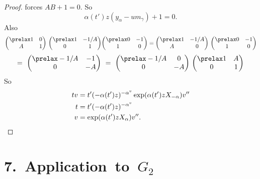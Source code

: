 \documentclass{memo-l}
\theoremstyle{definition}
\theoremstyle{remark}
\numberwithin{section}{chapter}
\numberwithin{equation}{chapter}
\begin{document}
\begin{proof}
\noindent
forces  $AB + 1 = 0$.  So
$$
{\alpha}(t')z(y_{{\alpha}}-um_{{\gamma}})+1 = 0 .
$$
Also
$$
{\begin{pmatrix} \prelax  1 & 0 \\ A & 1 \end{pmatrix}}\ {\begin{pmatrix} \prelax  1 & -1/A \\ 0 & 1 \end{pmatrix}}
{\begin{pmatrix} \prelax  0 & -1 \\ 1 & 0 \end{pmatrix}} = {\begin{pmatrix} \prelax  1 & -1/A \\ A & 0 \end{pmatrix}}\
{\begin{pmatrix} \prelax  0 & -1 \\ 1 & 0 \end{pmatrix}}
$$
$$
=\ {\begin{pmatrix} \prelax  -1/A & -1 \\ 0 & -A \end{pmatrix}}\ =\ 
{\begin{pmatrix} \prelax  -1/A & 0 \\ 0 & -A \end{pmatrix}}\ {\begin{pmatrix} \prelax  1 & A \\ 0 & 1 \end{pmatrix}}
$$
So
$$
\aligned
tv &= t'(-{\alpha}(t')z)^{-\alpha^v} \exp({\alpha}(t')zX_{-{\alpha}})v'' \\
t &= t'(-{\alpha}(t')z)^{-\alpha^v} \\
v &= \exp({\alpha}(t')zX_{{\alpha}})v'' .
\endaligned
$$
\end{proof} 








\section{ 7.\  Application\ to\ $G_2$}
\end{document}
